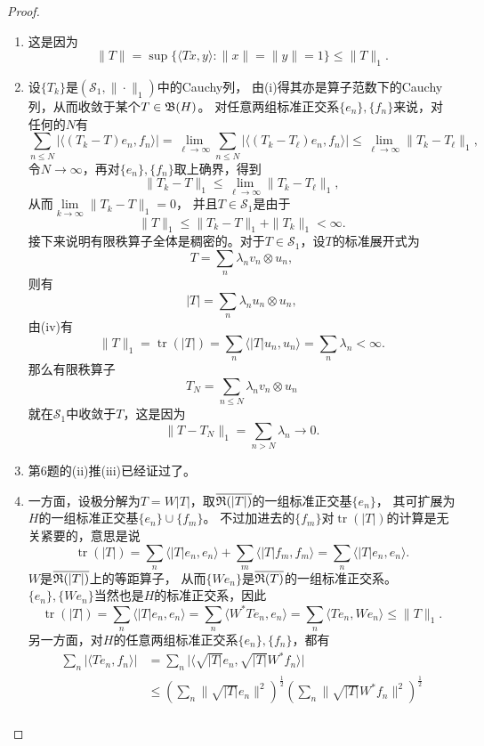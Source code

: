\begin{proof}
    \begin{enumerate}[label=(\roman*)]
    \item 这是因为
    \[\|T\|=\sup\{\langle Tx,y \rangle:\|x\|=\|y\|=1\}\leqslant\|T\|_1.\]
    \item 设$\{T_k\}$是$(\mathcal{S}_1,\|\cdot\|_1)$中的Cauchy列，
    由(i)得其亦是算子范数下的Cauchy列，从而收敛于某个$T\in\mathfrak{B}(H)$。
    对任意两组标准正交系$\{e_n\},\{f_n\}$来说，对任何的$N$有
    \[\sum_{n \leqslant N}|\langle (T_k-T)e_n,f_n \rangle|
    =\lim_{\ell\to\infty}\sum_{n \leqslant N}|\langle (T_k-T_\ell)e_n,f_n \rangle|
    \leqslant\lim_{\ell\to\infty}\|T_k-T_\ell\|_1,\]
    令$N\to\infty$，再对$\{e_n\},\{f_n\}$取上确界，得到
    \[\|T_k-T\|_1\leqslant\lim_{\ell\to\infty}\|T_k-T_\ell\|_1,\]
    从而$\lim\limits_{k\to\infty}\|T_k-T\|_1=0$，
    并且$T\in\mathcal{S}_1$是由于
    \[\|T\|_1\leqslant\|T_k-T\|_1+\|T_k\|_1<\infty.\]
    接下来说明有限秩算子全体是稠密的。对于$T\in\mathcal{S}_1$，设$T$的标准展开式为
    \[T=\sum_n\lambda_nv_n \otimes u_n,\]
    则有
    \[|T|=\sum_n\lambda_nu_n \otimes u_n,\]
    由(iv)有
    \[\|T\|_1=\operatorname{tr}(|T|)
    =\sum_n\langle|T|u_n,u_n\rangle=\sum_n\lambda_n<\infty.\]
    那么有限秩算子
    \[T_N=\sum_{n \leqslant N}\lambda_nv_n \otimes u_n\]
    就在$\mathcal{S}_1$中收敛于$T$，这是因为
    \[\|T-T_N\|_1=\sum_{n>N}\lambda_n\to0.\]
    \item 第6题的(ii)推(iii)已经证过了。
    \item 一方面，设极分解为$T=W|T|$，取$\overline{\mathfrak{R}(|T|)}$的一组标准正交基$\{e_n\}$，
    其可扩展为$H$的一组标准正交基$\{e_n\}\cup\{f_m\}$。
    不过加进去的$\{f_m\}$对$\operatorname{tr}(|T|)$的计算是无关紧要的，意思是说
    \[\operatorname{tr}(|T|)=\sum_n\langle|T|e_n,e_n\rangle
    +\sum_m\langle|T|f_m,f_m\rangle=\sum_n\langle|T|e_n,e_n\rangle.\]
    $W$是$\overline{\mathfrak{R}(|T|)}$上的等距算子，
    从而$\{We_n\}$是$\overline{\mathfrak{R}(T)}$的一组标准正交系。
    $\{e_n\},\{We_n\}$当然也是$H$的标准正交系，因此
    \[\operatorname{tr}(|T|)=\sum_n\langle|T|e_n,e_n\rangle
    =\sum_n\langle W^*Te_n,e_n \rangle=\sum_n\langle Te_n,We_n \rangle
    \leqslant\|T\|_1.\]
    另一方面，对$H$的任意两组标准正交系$\{e_n\},\{f_n\}$，都有
    \begin{align*}
        \sum_n|\langle Te_n,f_n \rangle|
        &=\sum_n\big|\big\langle\sqrt{|T|}e_n,\sqrt{|T|}W^*f_n\big\rangle\big|\\
        &\leqslant\left(\sum_n\big\|\sqrt{|T|}e_n\big\|^2\right)^\frac{1}{2}
        \left(\sum_n\big\|\sqrt{|T|}W^*f_n\big\|^2\right)^\frac{1}{2}\\

\end{align*}
\end{enumerate}
\end{proof}
